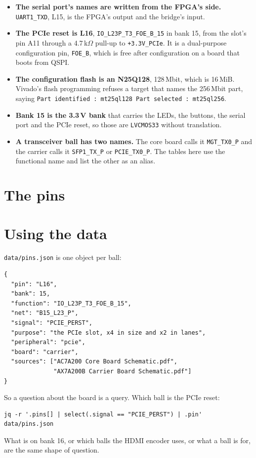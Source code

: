 \documentclass[10pt,a4paper]{article}
\begin{document}
\begin{itemize}
  \item \textbf{The serial port's names are written from the FPGA's
    side.} \texttt{UART1\_TXD}, L15, is the FPGA's output and the
    bridge's input.
  \item \textbf{The PCIe reset is L16}, \texttt{IO\_L23P\_T3\_FOE\_B\_15}
    in bank 15, from the slot's pin A11 through a 4.7\,k$\Omega$ pull-up
    to \texttt{+3.3V\_PCIe}. It is a dual-purpose configuration pin,
    \texttt{FOE\_B}, which is free after configuration on a board that
    boots from QSPI.
  \item \textbf{The configuration flash is an N25Q128}, 128\,Mbit, which
    is 16\,MiB. Vivado's flash programming refuses a target that names
    the 256\,Mbit part, saying \texttt{Part identified : mt25ql128 Part
    selected : mt25ql256}.
  \item \textbf{Bank 15 is the 3.3\,V bank} that carries the LEDs, the
    buttons, the serial port and the PCIe reset, so those are
    \texttt{LVCMOS33} without translation.
  \item \textbf{A transceiver ball has two names.} The core board calls
    it \texttt{MGT\_TX0\_P} and the carrier calls it
    \texttt{SFP1\_TX\_P} or \texttt{PCIE\_TX0\_P}. The tables here use
    the functional name and list the other as an alias.
\end{itemize}

\section{The pins}



\section{Using the data}

\texttt{data/pins.json} is one object per ball:

\begin{verbatim}
{
  "pin": "L16",
  "bank": 15,
  "function": "IO_L23P_T3_FOE_B_15",
  "net": "B15_L23_P",
  "signal": "PCIE_PERST",
  "purpose": "the PCIe slot, x4 in size and x2 in lanes",
  "peripheral": "pcie",
  "board": "carrier",
  "sources": ["AC7A200 Core Board Schematic.pdf",
              "AX7A200B Carrier Board Schematic.pdf"]
}
\end{verbatim}

So a question about the board is a query. Which ball is the PCIe reset:

\begin{verbatim}
jq -r '.pins[] | select(.signal == "PCIE_PERST") | .pin' data/pins.json
\end{verbatim}

What is on bank 16, or which balls the HDMI encoder uses, or what a ball
is for, are the same shape of question.
\end{document}
